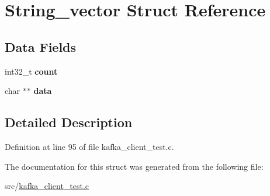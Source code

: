 \hypertarget{structString__vector}{\section{\-String\-\_\-vector \-Struct \-Reference}
\label{structString__vector}
}
\subsection*{\-Data \-Fields}
\begin{DoxyCompactItemize}
\item 
\hypertarget{structString__vector_aa3749113f2ee50991e0398e890ca05e0}{int32\-\_\-t {\bfseries count}}\label{structString__vector_aa3749113f2ee50991e0398e890ca05e0}

\item 
\hypertarget{structString__vector_ae65e2b4f4d044be7dfa6c6279df87c7e}{char $\ast$$\ast$ {\bfseries data}}\label{structString__vector_ae65e2b4f4d044be7dfa6c6279df87c7e}

\end{DoxyCompactItemize}


\subsection{\-Detailed \-Description}


\-Definition at line 95 of file kafka\-\_\-client\-\_\-test.\-c.



\-The documentation for this struct was generated from the following file\-:\begin{DoxyCompactItemize}
\item 
src/\hyperlink{kafka__client__test_8c}{kafka\-\_\-client\-\_\-test.\-c}\end{DoxyCompactItemize}
